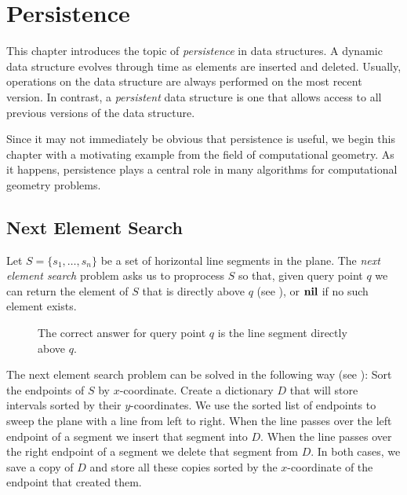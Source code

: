 \chapter{Persistence}



This chapter introduces the topic of \emph{persistence} in data
structures.  A dynamic data structure evolves through time as elements
are inserted and deleted.  Usually, operations on the data structure
are always performed on the most recent version.  In contrast, a
\emph{persistent} data structure is one that allows access to all
previous versions of the data structure.

Since it may not immediately be obvious that persistence is useful, we
begin this chapter with a motivating example from the field of
computational geometry.  As it happens, persistence plays a central
role in many algorithms for computational geometry problems.


\section{Next Element Search}

Let $S=\{s_1,\ldots,s_n\}$ be a set of horizontal line segments in the
plane.  The \emph{next element search} problem asks us to proprocess
$S$ so that, given query point $q$ we can return the element of $S$
that is directly above $q$ (see ), or $\mathbf{nil}$ if
no such element exists.

\begin{figure}
\caption[The next element search problem.]{The correct answer for
query point $q$ is the line segment directly above $q$.}
\end{figure}

The next element search problem can be solved in the following way
(see ): Sort the endpoints of $S$ by
$x$-coordinate.  Create a dictionary $D$ that will store intervals
sorted by their $y$-coordinates.  We use the sorted list of endpoints
to sweep the plane with a line from left to right.  When the line
passes over the left endpoint of a segment we insert that segment into
$D$.  When the line passes over the right endpoint of a segment we
delete that segment from $D$. In both cases, we save a copy of $D$ and
store all these copies sorted by the $x$-coordinate of the endpoint
that created them.

